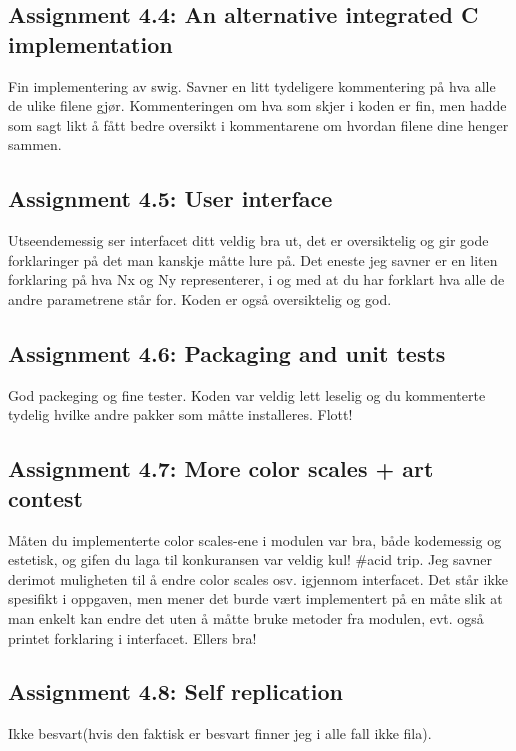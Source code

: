\documentclass[a4paper]{article}
\begin{document}
\subsection*{Assignment 4.4:  An alternative integrated C implementation}
Fin implementering av swig. Savner en litt tydeligere kommentering på hva alle de ulike filene gjør. Kommenteringen om hva som skjer i koden er fin, men hadde som sagt likt å fått bedre oversikt i kommentarene om hvordan filene dine henger sammen.

\subsection*{Assignment 4.5: User interface}
Utseendemessig ser interfacet ditt veldig bra ut, det er oversiktelig og gir gode forklaringer på det man kanskje måtte lure på. Det eneste jeg savner er en liten forklaring på hva Nx og Ny representerer, i og med at du har forklart hva alle de andre parametrene står for. Koden er også oversiktelig og god.

\subsection*{Assignment 4.6:  Packaging and unit tests}
God packeging og fine tester. Koden var veldig lett leselig og du kommenterte tydelig hvilke andre pakker som måtte installeres. Flott!

\subsection*{Assignment 4.7: More color scales + art contest}
Måten du implementerte color scales-ene i modulen var bra, både kodemessig og estetisk, og gifen du laga til konkuransen var veldig kul! \#acid trip.
Jeg savner derimot muligheten til å endre color scales osv. igjennom interfacet. Det står ikke spesifikt i oppgaven, men mener det burde vært implementert på en måte slik at man enkelt kan endre det uten å måtte bruke metoder fra modulen, evt. også printet forklaring i interfacet. Ellers bra!

\subsection*{Assignment 4.8: Self replication}
Ikke besvart(hvis den faktisk er besvart finner jeg i alle fall ikke fila).




\end{document}

